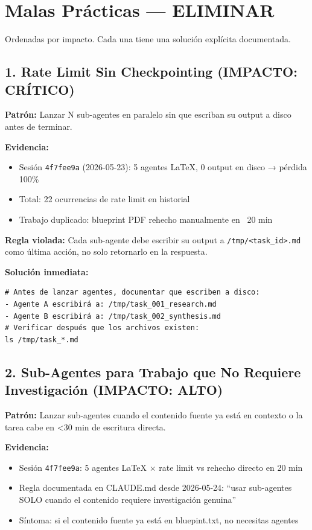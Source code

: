 \documentclass[12pt,a4paper,spanish]{article}
\begin{document}
\section{Malas Prácticas — ELIMINAR}

Ordenadas por impacto. Cada una tiene una solución explícita documentada.

\subsection{1. Rate Limit Sin Checkpointing (IMPACTO: CRÍTICO)}

\textbf{Patrón:} Lanzar N sub-agentes en paralelo sin que escriban su output a disco antes de terminar.

\textbf{Evidencia:}
\begin{itemize}
  \item Sesión \texttt{4f7fee9a} (2026-05-23): 5 agentes LaTeX, 0 output en disco → pérdida 100\%
  \item Total: 22 ocurrencias de rate limit en historial
  \item Trabajo duplicado: blueprint PDF rehecho manualmente en ~20 min
\end{itemize}

\textbf{Regla violada:} Cada sub-agente debe escribir su output a \texttt{/tmp/<task\_id>.md} como última acción, no solo retornarlo en la respuesta.

\textbf{Solución inmediata:}
\begin{lstlisting}
# Antes de lanzar agentes, documentar que escriben a disco:
- Agente A escribirá a: /tmp/task_001_research.md
- Agente B escribirá a: /tmp/task_002_synthesis.md
# Verificar después que los archivos existen:
ls /tmp/task_*.md
\end{lstlisting}

\subsection{2. Sub-Agentes para Trabajo que No Requiere Investigación (IMPACTO: ALTO)}

\textbf{Patrón:} Lanzar sub-agentes cuando el contenido fuente ya está en contexto o la tarea cabe en <30 min de escritura directa.

\textbf{Evidencia:}
\begin{itemize}
  \item Sesión \texttt{4f7fee9a}: 5 agentes LaTeX × rate limit vs rehecho directo en 20 min
  \item Regla documentada en CLAUDE.md desde 2026-05-24: ``usar sub-agentes SOLO cuando el contenido requiere investigación genuina''
  \item Síntoma: si el contenido fuente ya está en bluepint.txt, no necesitas agentes
\end{itemize}
\end{document}
